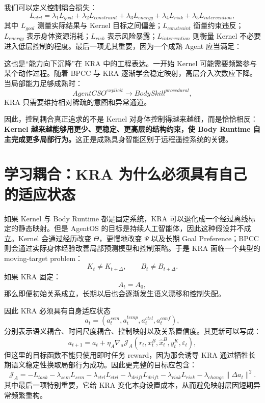 我们可以定义控制耦合损失：
\[
L_{ctrl}
=
\lambda_1 L_{goal}
+
\lambda_2 L_{constraint}
+
\lambda_3 L_{energy}
+
\lambda_4 L_{risk}
+
\lambda_5 L_{intervention},
\]
其中 $L_{goal}$ 测量实际结果与 Kernel 目标之间偏差；$L_{constraint}$ 衡量约束违反；$L_{energy}$ 表示身体资源消耗；$L_{risk}$ 表示风险暴露；$L_{intervention}$ 则衡量 Kernel 不必要进入低层控制的程度。最后一项尤其重要，因为一个成熟 Agent 应当满足：
\begin{statementbox}
\centering
{}
\end{statementbox}

这也是``能力向下沉降''在 KRA 中的工程表达。一开始 Kernel 可能需要频繁参与某个动作过程。随着 BPCC 与 KRA 逐渐学会稳定映射，高层介入次数应下降。当局部能力足够成熟时：
\[
AgentCSO^{explicit}
\rightarrow
BodySkill^{procedural},
\]
KRA 只需要维持相对稀疏的意图和异常通道。

因此，控制耦合真正追求的不是 Kernel 对身体控制得越来越细，而是恰恰相反：\textbf{Kernel 越来越能够用更少、更稳定、更高层的结构约束，使 Body Runtime 自主完成更多局部行为。}这正是成熟具身智能区别于远程遥控系统的关键。

\section{学习耦合：KRA 为什么必须具有自己的适应状态}
\label{sec:kra-learning-coupling}

如果 Kernel 与 Body Runtime 都是固定系统，KRA 可以退化成一个经过离线标定的静态映射。但是 AgentOS 的目标是持续人工智能体，因此这种假设并不成立。Kernel 会通过经历改变 $\Theta$，更慢地改变 $\Psi$ 以及长期 Goal Preference；BPCC 则会通过实际身体经验改善局部预测模型和控制策略。于是 KRA 面临一个典型的 moving-target problem：
\[
K_t\neq K_{t+\Delta},
\qquad
B_t\neq B_{t+\Delta}.
\]
如果 KRA 固定：
\[
A_t=A_0,
\]
那么即便初始关系成立，长期以后也会逐渐发生语义漂移和控制失配。

因此 KRA 必须具有自身适应状态
\[
a_t
=
\left(
a_t^{sem},
a_t^{temp},
a_t^{ctrl},
a_t^{conf}
\right),
\]
分别表示语义耦合、时间尺度耦合、控制映射以及关系置信度。其更新可以写成：
\[
a_{t+1}
=
a_t
+
\eta_A
\nabla_a
\mathcal J_A
\left(
r_t,
x_t^B,
\hat x_t^B,
y_t^K,
\varepsilon_t
\right),
\]
但这里的目标函数不能只使用即时任务 reward，因为那会诱导 KRA 通过牺牲长期语义稳定性换取局部行为成功。因此更完整的目标应包含：
\[
\mathcal J_A
=
-L_{task}
-\lambda_{sem}L_{sem}
-\lambda_{ctrl}L_{ctrl}
-\lambda_{drift}L_{drift}
-\lambda_{risk}L_{risk}
-\lambda_{change}\|\Delta a_t\|^2.
\]
其中最后一项特别重要，它给 KRA 变化本身设置成本，从而避免映射层因短期异常频繁重构。

